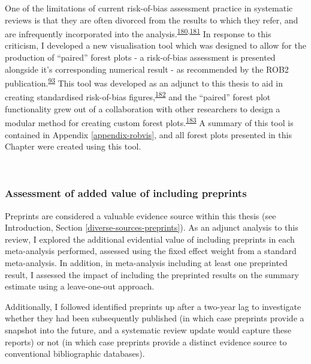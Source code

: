 \documentclass[a4paper, twoside]{templates/ociamthesis}
\begin{document}
One of the limitations of current risk-of-bias assessment practice in systematic reviews is that they are often divorced from the results to which they refer, and are infrequently incorporated into the analysis.\textsuperscript{\protect\hyperlink{ref-marusic2020}{180},\protect\hyperlink{ref-katikireddi2015}{181}} In response to this criticism, I developed a new visualisation tool which was designed to allow for the production of ``paired'' forest plots - a risk-of-bias assessment is presented alongside it's corresponding numerical result - as recommended by the ROB2 publication.\textsuperscript{\protect\hyperlink{ref-sterne2019}{93}} This tool was developed as an adjunct to this thesis to aid in creating standardised risk-of-bias figures,\textsuperscript{\protect\hyperlink{ref-mcguinness2020robvisPaper}{182}} and the ``paired'' forest plot functionality grew out of a collaboration with other researchers to design a modular method for creating custom forest plots.\textsuperscript{\protect\hyperlink{ref-zotero-14999}{183}} A summary of this tool is contained in Appendix \ref{appendix-robvis}, and all forest plots presented in this Chapter were created using this tool.

~

\hypertarget{assessment-of-added-value-of-including-preprints}{%
\subsubsection{Assessment of added value of including preprints}\label{assessment-of-added-value-of-including-preprints}}

Preprints are considered a valuable evidence source within this thesis (see Introduction, Section \ref{diverse-sources-preprints}). As an adjunct analysis to this review, I explored the additional evidential value of including preprints in each meta-analysis performed, assessed using the fixed effect weight from a standard meta-analysis. In addition, in meta-analysis including at least one preprinted result, I assessed the impact of including the preprinted results on the summary estimate using a leave-one-out approach.

Additionally, I followed identified preprints up after a two-year lag to investigate whether they had been subsequently published (in which case preprints provide a snapshot into the future, and a systematic review update would capture these reports) or not (in which case preprints provide a distinct evidence source to conventional bibliographic databases).
\end{document}

